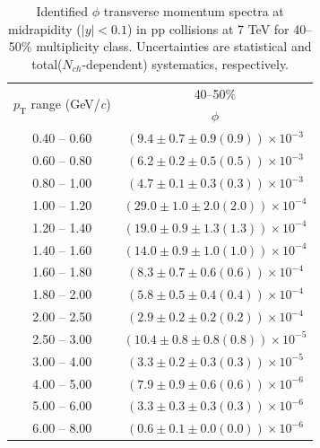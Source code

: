 \begin{table}
\caption{Identified $\phi$ transverse momentum spectra at midrapidity ($|y|<0.1$) in pp collisions at 7 TeV for 40--50\% multiplicity class. Uncertainties are statistical and total($N_{ch}$-dependent) systematics, respectively.}
\label{tab:Phi_40to50}
\begin{center}
\begin{tabular}{ c | c }
\hline
\multirow{2}{*}{$p_{\mathrm{T}}$ range (GeV/\textit{c})} & \multicolumn{1}{c}{40--50\%} \\ & $\phi$\\ 
\hline
0.40 -- 0.60 & $(9.4\pm0.7\pm0.9(0.9))\times10^{-3}$ \\ 
0.60 -- 0.80 & $(6.2\pm0.2\pm0.5(0.5))\times10^{-3}$ \\ 
0.80 -- 1.00 & $(4.7\pm0.1\pm0.3(0.3))\times10^{-3}$ \\ 
1.00 -- 1.20 & $(29.0\pm1.0\pm2.0(2.0))\times10^{-4}$ \\ 
1.20 -- 1.40 & $(19.0\pm0.9\pm1.3(1.3))\times10^{-4}$ \\ 
1.40 -- 1.60 & $(14.0\pm0.9\pm1.0(1.0))\times10^{-4}$ \\ 
1.60 -- 1.80 & $(8.3\pm0.7\pm0.6(0.6))\times10^{-4}$ \\ 
1.80 -- 2.00 & $(5.8\pm0.5\pm0.4(0.4))\times10^{-4}$ \\ 
2.00 -- 2.50 & $(2.9\pm0.2\pm0.2(0.2))\times10^{-4}$ \\ 
2.50 -- 3.00 & $(10.4\pm0.8\pm0.8(0.8))\times10^{-5}$ \\ 
3.00 -- 4.00 & $(3.3\pm0.2\pm0.3(0.3))\times10^{-5}$ \\ 
4.00 -- 5.00 & $(7.9\pm0.9\pm0.6(0.6))\times10^{-6}$ \\ 
5.00 -- 6.00 & $(3.3\pm0.3\pm0.3(0.3))\times10^{-6}$ \\ 
6.00 -- 8.00 & $(0.6\pm0.1\pm0.0(0.0))\times10^{-6}$ \\ 
\hline
\end{tabular}
\end{center}
\end{table}
 
